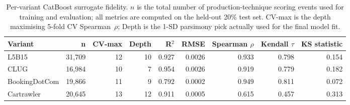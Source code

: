 \begin{table}
\caption{Per-variant CatBoost surrogate fidelity. $n$ is the total number of production-technique scoring events used for training and evaluation; all metrics are computed on the held-out 20\% test set. CV-max is the depth maximising 5-fold CV Spearman~$\rho$; Depth is the 1-SD parsimony pick actually used for the final model fit.}
\label{tab:surrogate_fidelity_per_variant}
\begin{tabular}{lrrrrrrrr}
\toprule
Variant & n & CV-max & Depth & R$^2$ & RMSE & Spearman $\rho$ & Kendall $\tau$ & KS statistic \\
\midrule
L5B15 & 31,709 & 12 & 10 & 0.927 & 0.0026 & 0.933 & 0.798 & 0.154 \\
CLUG & 16,984 & 10 & 7 & 0.954 & 0.0026 & 0.919 & 0.779 & 0.182 \\
BookingDotCom & 19,866 & 11 & 9 & 0.792 & 0.0002 & 0.949 & 0.811 & 0.072 \\
Cartrawler & 20,645 & 13 & 12 & 0.911 & 0.0005 & 0.615 & 0.457 & 0.313 \\
\bottomrule
\end{tabular}
\end{table}
